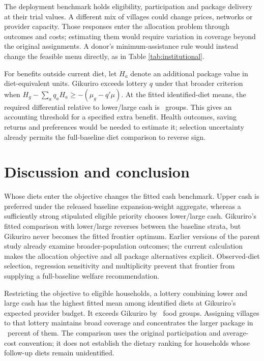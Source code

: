 \documentclass[11pt]{article}
\begin{document}
The deployment benchmark holds eligibility, participation and package delivery at their trial values. A different mix of villages could change prices, networks or provider capacity. Those responses enter the allocation problem through outcomes and costs; estimating them would require variation in coverage beyond the original assignments. A donor's minimum-assistance rule would instead change the feasible menu directly, as in Table \ref{tab:institutional}.

For benefits outside current diet, let $H_a$ denote an additional package value in diet-equivalent units. Gikuriro exceeds lottery $q$ under that broader criterion when $H_g-\sum_aq_aH_a\geq-(\mu_g-q'\mu)$. At the fitted identified-diet means, the required differential relative to lower/large cash is \GKFittedRegret\ groups. This gives an accounting threshold for a specified extra benefit. Health outcomes, saving returns and preferences would be needed to estimate it; selection uncertainty already permits the full-baseline diet comparison to reverse sign.

\section{Discussion and conclusion}

Whose diets enter the objective changes the fitted cash benchmark. Upper cash is preferred under the released baseline expansion-weight aggregate, whereas a sufficiently strong stipulated eligible priority chooses lower/large cash. Gikuriro's fitted comparison with lower/large reverses between the baseline strata, but Gikuriro never becomes the fitted frontier optimum. Earlier versions of the parent study already examine broader-population outcomes; the current calculation makes the allocation objective and all package alternatives explicit. Observed-diet selection, regression sensitivity and multiplicity prevent that frontier from supplying a full-baseline welfare recommendation.


Restricting the objective to eligible households, a lottery combining lower and large cash has the highest fitted mean among identified diets at Gikuriro's expected provider budget. It exceeds Gikuriro by \GKFittedRegret\ food groups. Assigning villages to that lottery maintains broad coverage and concentrates the larger package in \LowerLargeShare\ percent of them. The comparison uses the original participation and average-cost convention; it does not establish the dietary ranking for households whose follow-up diets remain unidentified.
\end{document}
